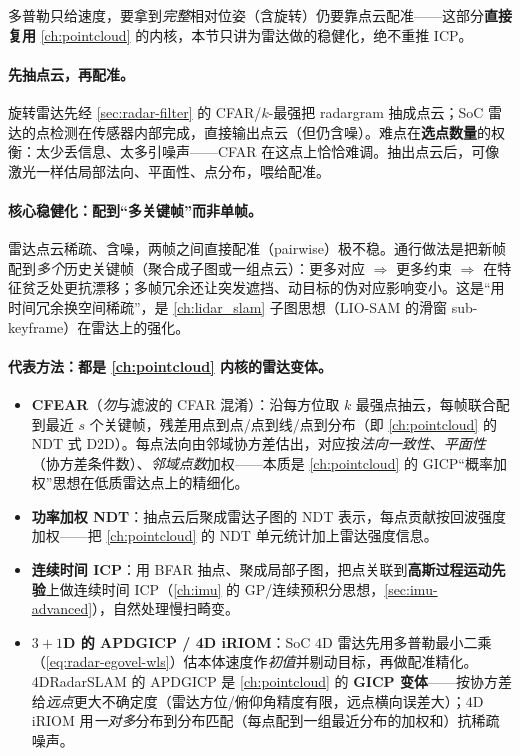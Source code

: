 多普勒只给速度，要拿到\emph{完整}相对位姿（含旋转）仍要靠点云配准——这部分\textbf{直接复用} \cref{ch:pointcloud} 的内核，本节只讲为雷达做的稳健化，绝不重推 ICP。

\paragraph{先抽点云，再配准。}
旋转雷达先经 \cref{sec:radar-filter} 的 CFAR/$k$-最强把 radargram 抽成点云；SoC 雷达的点检测在传感器内部完成，直接输出点云（但仍含噪）。难点在\textbf{选点数量}的权衡：太少丢信息、太多引噪声——CFAR 在这点上恰恰难调\cite{carlone2026handbook}。抽出点云后，可像激光一样估局部法向、平面性、点分布，喂给配准。

\paragraph{核心稳健化：配到“多关键帧”而非单帧。}
雷达点云稀疏、含噪，两帧之间直接配准（pairwise）极不稳。通行做法是把新帧配到\emph{多个}历史关键帧（聚合成子图或一组点云）\cite{carlone2026handbook}：更多对应 $\Rightarrow$ 更多约束 $\Rightarrow$ 在特征贫乏处更抗漂移；多帧冗余还让突发遮挡、动目标的伪对应影响变小。这是“用时间冗余换空间稀疏”，是 \cref{ch:lidar_slam} 子图思想（LIO-SAM 的滑窗 sub-keyframe）在雷达上的强化。

\paragraph{代表方法：都是 \cref{ch:pointcloud} 内核的雷达变体。}
\begin{itemize}
  \item \textbf{CFEAR}\cite{carlone2026handbook}（\emph{勿}与滤波的 CFAR 混淆）：沿每方位取 $k$ 最强点抽云，每帧联合配到最近 $s$ 个关键帧，残差用点到点/点到线/点到分布（即 \cref{ch:pointcloud} 的 NDT 式 D2D）。每点法向由邻域协方差估出，对应按\emph{法向一致性}、\emph{平面性}（协方差条件数）、\emph{邻域点数}加权——本质是 \cref{ch:pointcloud} 的 GICP“概率加权”思想在低质雷达点上的精细化。
  \item \textbf{功率加权 NDT}：抽点云后聚成雷达子图的 NDT 表示，每点贡献按回波强度加权——把 \cref{ch:pointcloud} 的 NDT 单元统计加上雷达强度信息。
  \item \textbf{连续时间 ICP}：用 BFAR 抽点、聚成局部子图，把点关联到\textbf{高斯过程运动先验}上做连续时间 ICP（\cref{ch:imu} 的 GP/连续预积分思想，\cref{sec:imu-advanced}），自然处理慢扫畸变。
  \item \textbf{$3{+}1$D 的 APDGICP / 4D iRIOM}：SoC $4$D 雷达先用多普勒最小二乘（\cref{eq:radar-egovel-wls}）估本体速度作\emph{初值}并剔动目标，再做配准精化。4DRadarSLAM 的 APDGICP 是 \cref{ch:pointcloud} 的 \textbf{GICP 变体}——按协方差给\emph{远点}更大不确定度（雷达方位/俯仰角精度有限，远点横向误差大）；4D iRIOM 用\emph{一对多}分布到分布匹配（每点配到一组最近分布的加权和）抗稀疏噪声。
\end{itemize}

